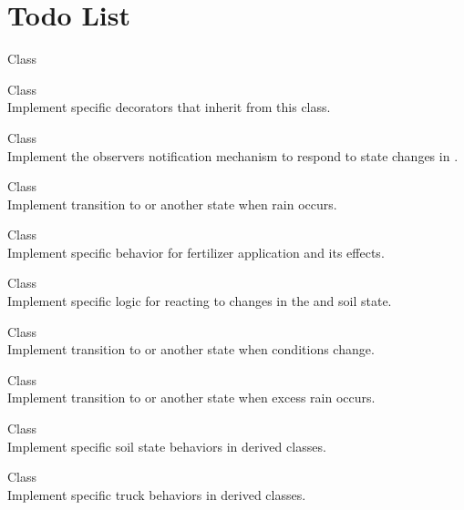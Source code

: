 \chapter{Todo List}
\hypertarget{todo}{}\label{todo}

\begin{DoxyRefList}
\item[Class \doxylink{class_barn_decorator}{Barn\+Decorator} ]\hfill \\
\label{todo__todo000001}%
%
 
\item[Class \doxylink{class_decorator}{Decorator} ]\hfill \\
\label{todo__todo000002}%
%
Implement specific decorators that inherit from this class. 
\item[Class \doxylink{class_delivery_truck}{Delivery\+Truck} ]\hfill \\
\label{todo__todo000003}%
%
Implement the observer\textquotesingle{}s notification mechanism to respond to state changes in . 
\item[Class \doxylink{class_dry_soil}{Dry\+Soil} ]\hfill \\
\label{todo__todo000004}%
%
Implement transition to  or another state when rain occurs. 
\item[Class \doxylink{class_fertilizer_decorator}{Fertilizer\+Decorator} ]\hfill \\
\label{todo__todo000005}%
%
Implement specific behavior for fertilizer application and its effects. 
\item[Class \doxylink{class_fertilizer_truck}{Fertilizer\+Truck} ]\hfill \\
\label{todo__todo000006}%
%
Implement specific logic for reacting to changes in the  and soil state. 
\item[Class \doxylink{class_flooded_soil}{Flooded\+Soil} ]\hfill \\
\label{todo__todo000007}%
%
Implement transition to  or another state when conditions change. 
\item[Class \doxylink{class_fruitful_soil}{Fruitful\+Soil} ]\hfill \\
\label{todo__todo000008}%
%
Implement transition to  or another state when excess rain occurs. 
\item[Class \doxylink{class_soil}{Soil} ]\hfill \\
\label{todo__todo000009}%
%
Implement specific soil state behaviors in derived classes. 
\item[Class \doxylink{class_truck}{Truck} ]\hfill \\
\label{todo__todo000010}%
%
Implement specific truck behaviors in derived classes.
\end{DoxyRefList}
